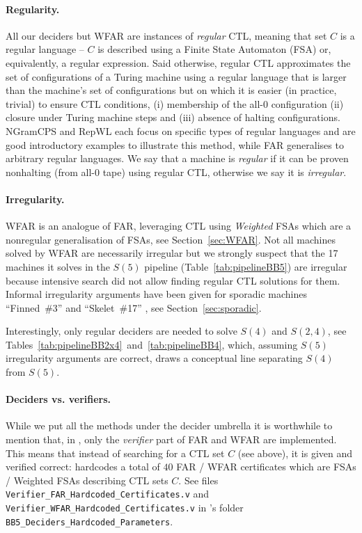 \paragraph{Regularity.} All our deciders but WFAR are instances of \textit{regular} CTL, meaning that set $C$ is a regular language -- \ie $C$ is described using a Finite State Automaton (FSA) or, equivalently, a regular expression. Said otherwise, regular CTL approximates the set of configurations of a Turing machine using a regular language that is larger than the machine's set of configurations but on which it is easier (in practice, trivial) to ensure CTL conditions, \ie (i) membership of the all-0 configuration (ii) closure under Turing machine steps and (iii) absence of halting configurations. NGramCPS and RepWL each focus on specific types of regular languages and are good introductory examples to illustrate this method, while FAR generalises to arbitrary regular languages. We say that a machine is \textit{regular} if it can be proven nonhalting (from all-0 tape) using regular CTL, otherwise we say it is \textit{irregular}.

\vspace{-1ex}
\paragraph{Irregularity.} WFAR is an analogue of FAR, leveraging CTL using \textit{Weighted} FSAs which are a nonregular generalisation of FSAs, see Section~\ref{sec:WFAR}. Not all machines solved by WFAR are necessarily irregular but we strongly suspect that the 17 machines it solves in the $S(5)$ pipeline (Table~\ref{tab:pipelineBB5}) are irregular because intensive search did not allow finding regular CTL solutions for them. Informal irregularity arguments have been given for sporadic machines ``Finned~\#3'' and ``Skelet~\#17'' \cite{irregularFinned3, irregularSk17}, see Section~\ref{sec:sporadic}.

Interestingly, only regular deciders are needed to solve $S(4)$ and $S(2,4)$, see Tables~\ref{tab:pipelineBB2x4}~and~\ref{tab:pipelineBB4}, which, assuming $S(5)$ irregularity arguments are correct, draws a conceptual line separating $S(4)$ from $S(5)$.

\vspace{-1ex}
\paragraph{Deciders vs. verifiers.} While we put all the methods under the decider umbrella it is worthwhile to mention that, in \CoqBB, only the \textit{verifier} part of FAR and WFAR are implemented. This means that instead of searching for a CTL set $C$ (see above), it is given and verified correct: \CoqBB hardcodes a total of $40$ FAR /
WFAR certificates which are FSAs / Weighted FSAs describing CTL sets $C$. See files \texttt{Verifier\_FAR\_Hardcoded\_Certificates.v} and \texttt{Verifier\_WFAR\_Hardcoded\_Certificates.v} in \CoqBB's folder \texttt{BB5\_Deciders\_Hardcoded\_Parameters}.

